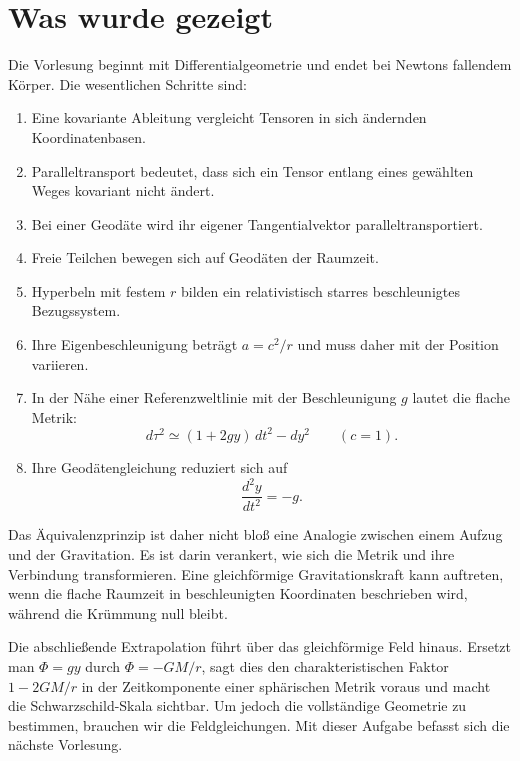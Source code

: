 \section{Was wurde gezeigt}

Die Vorlesung beginnt mit Differentialgeometrie und endet bei Newtons fallendem Körper. Die wesentlichen Schritte sind:
\begin{enumerate}
\item Eine kovariante Ableitung vergleicht Tensoren in sich ändernden Koordinatenbasen.
\item Paralleltransport bedeutet, dass sich ein Tensor entlang eines gewählten Weges kovariant nicht ändert.
\item Bei einer Geodäte wird ihr eigener Tangentialvektor paralleltransportiert.
\item Freie Teilchen bewegen sich auf Geodäten der Raumzeit.
\item Hyperbeln mit festem \(r\) bilden ein relativistisch starres beschleunigtes Bezugssystem.
\item Ihre Eigenbeschleunigung beträgt \(a=c^2/r\) und muss daher mit der Position variieren.
\item In der Nähe einer Referenzweltlinie mit der Beschleunigung \(g\) lautet die flache Metrik:
\begin{equation}
d\tau^2\simeq(1+2gy)\,dt^2-dy^2
\qquad(c=1).
\end{equation}
\item Ihre Geodätengleichung reduziert sich auf
\begin{equation}
\frac{d^2y}{dt^2}=-g.
\end{equation}
\end{enumerate}

Das Äquivalenzprinzip ist daher nicht bloß eine Analogie zwischen einem Aufzug und der Gravitation. Es ist darin verankert, wie sich die Metrik und ihre Verbindung transformieren. Eine gleichförmige Gravitationskraft kann auftreten, wenn die flache Raumzeit in beschleunigten Koordinaten beschrieben wird, während die Krümmung null bleibt.

Die abschließende Extrapolation führt über das gleichförmige Feld hinaus. Ersetzt man \(\Phi=gy\) durch \(\Phi=-GM/r\), sagt dies den charakteristischen Faktor \(1-2GM/r\) in der Zeitkomponente einer sphärischen Metrik voraus und macht die Schwarzschild-Skala sichtbar. Um jedoch die vollständige Geometrie zu bestimmen, brauchen wir die Feldgleichungen. Mit dieser Aufgabe befasst sich die nächste Vorlesung.
